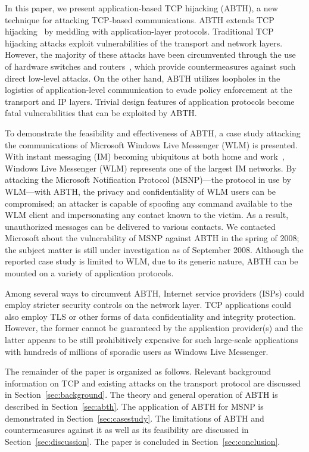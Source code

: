 \documentclass{sig-alternate}
\begin{document}
In this paper, we present application-based TCP hijacking (ABTH), a new technique for attacking TCP-based communications.
ABTH extends TCP hijacking~\cite{stamp:infosec} by meddling with application-layer protocols.
Traditional TCP hijacking attacks exploit vulnerabilities of the transport and network layers.
However, the majority of these attacks have been circumvented through the use of hardware switches and routers~\cite{dubrawsky:layer2}, which provide countermeasures against such direct low-level attacks.
On the other hand, ABTH utilizes loopholes in the logistics of application-level communication to evade policy enforcement at the transport and IP layers.
Trivial design features of application protocols become fatal vulnerabilities that can be exploited by ABTH.

To demonstrate the feasibility and effectiveness of ABTH, a case study attacking the communications of Microsoft Windows Live Messenger (WLM) is presented.
With instant messaging (IM) becoming ubiquitous at both home and work~\cite{aol:survey}, Windows Live Messenger (WLM) represents one of the largest IM networks.
By attacking the Microsoft Notification Protocol (MSNP)---the protocol in use by WLM---with ABTH, the privacy and confidentiality of WLM users can be compromised; an attacker is capable of spoofing any command available to the WLM client and impersonating any contact known to the victim.
As a result, unauthorized messages can be delivered to various contacts.
We contacted Microsoft about the vulnerability of MSNP against ABTH in the spring of 2008; the subject matter is still under investigation as of September 2008.
Although the reported case study is limited to WLM, due to its generic nature, ABTH can be mounted on a variety of application protocols.

Among several ways to circumvent ABTH, Internet service providers (ISPs) could employ stricter security controls on the network layer.
TCP applications could also employ TLS or other forms of data confidentiality and integrity protection.
However, the former cannot be guaranteed by the application provider(s) and the latter appears to be still prohibitively expensive for such large-scale applications with hundreds of millions of sporadic users as Windows Live Messenger.

The remainder of the paper is organized as follows.
Relevant background information on TCP and existing attacks on the transport protocol are discussed in Section~\ref{sec:background}.
The theory and general operation of ABTH is described in Section~\ref{sec:abth}.
The application of ABTH for MSNP is demonstrated in Section~\ref{sec:casestudy}.
The limitations of ABTH and countermeasures against it as well as its feasibility are discussed in Section~\ref{sec:discussion}.
The paper is concluded in Section~\ref{sec:conclusion}.
\end{document}
